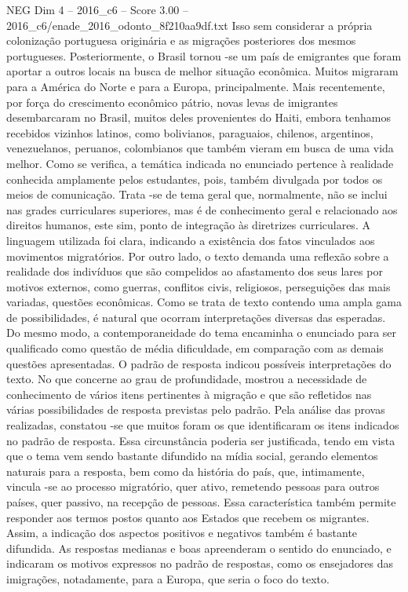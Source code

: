 \begin{textsample}{NEG Dim 4 – 2016\_c6 – Score 3.00 – 2016\_c6/enade\_2016\_odonto\_8f210aa9df.txt}
Isso sem considerar a própria colonização portuguesa originária e as migrações posteriores dos mesmos portugueses.
Posteriormente, o Brasil tornou -se um país de emigrantes que foram aportar a outros locais na busca de melhor situação econômica.
Muitos migraram para a América do Norte e para a Europa, principalmente.
Mais recentemente, por força do crescimento econômico pátrio, novas levas de imigrantes desembarcaram no Brasil, muitos deles provenientes do Haiti, embora tenhamos recebidos vizinhos latinos, como bolivianos, paraguaios, chilenos, argentinos, venezuelanos, peruanos, colombianos que também vieram em busca de uma vida melhor.
Como se verifica, a temática indicada no enunciado pertence à realidade conhecida amplamente pelos estudantes, pois, também divulgada por todos os meios de comunicação.
Trata -se de tema geral que, normalmente, não se inclui nas grades curriculares superiores, mas é de conhecimento geral e relacionado aos direitos humanos, este sim, ponto de integração às diretrizes curriculares.
A linguagem utilizada foi clara, indicando a existência dos fatos vinculados aos movimentos migratórios.
Por outro lado, o texto demanda uma reflexão sobre a realidade dos indivíduos que são compelidos ao afastamento dos seus lares por motivos externos, como guerras, conflitos civis, religiosos, perseguições das mais variadas, questões econômicas.
Como se trata de texto contendo uma ampla gama de possibilidades, é natural que ocorram interpretações diversas das esperadas.
Do mesmo modo, a contemporaneidade do tema encaminha o enunciado para ser qualificado como questão de média dificuldade, em comparação com as demais questões apresentadas.
O padrão de resposta indicou possíveis interpretações do texto.
No que concerne ao grau de profundidade, mostrou a necessidade de conhecimento de vários itens pertinentes à migração e que são refletidos nas várias possibilidades de resposta previstas pelo padrão.
Pela análise das provas realizadas, constatou -se que muitos foram os que identificaram os itens indicados no padrão de resposta.
Essa circunstância poderia ser justificada, tendo em vista que o tema vem sendo bastante difundido na mídia social, gerando elementos naturais para a resposta, bem como da história do país, que, intimamente, vincula -se ao processo migratório, quer ativo, remetendo pessoas para outros países, quer passivo, na recepção de pessoas.
Essa característica também permite responder aos termos postos quanto aos Estados que recebem os migrantes.
Assim, a indicação dos aspectos positivos e negativos também é bastante difundida.
As respostas medianas e boas apreenderam o sentido do enunciado, e indicaram os motivos expressos no padrão de respostas, como os ensejadores das imigrações, notadamente, para a Europa, que seria o foco do texto.

\end{textsample}
